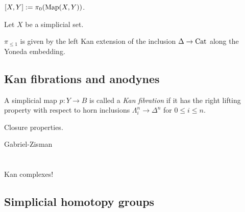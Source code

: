 \documentclass{../../../small}
\begin{document}
\begin{definition*}
$[X,Y]:=\pi_0(\operatorname{Map}(X,Y))$.
\end{definition*}

\begin{proposition*}
Let $X$ be a simplicial set.
\begin{parts}
\item
$\pi_{\le1}$ is given by the left Kan extension of the inclusion $\Delta\to\operatorname{Cat}$ along the Yoneda embedding.
\end{parts}
\end{proposition*}


\begin{definition*}

\end{definition*}







\subsection{Kan fibrations and anodynes}


\begin{definition*}
A simplicial map $p:Y\to B$ is called a \emph{Kan fibration} if it has the right lifting property with respect to horn inclusions $\Lambda_i^n\to\Delta^n$ for $0\le i\le n$.
\end{definition*}

\begin{proposition*}
Closure properties.
\end{proposition*}

\begin{definition*}[Anodynes]
Gabriel-Zisman
\end{definition*}





\newpage
\section{}




Kan complexes!

\subsection{Simplicial homotopy groups}
\end{document}
